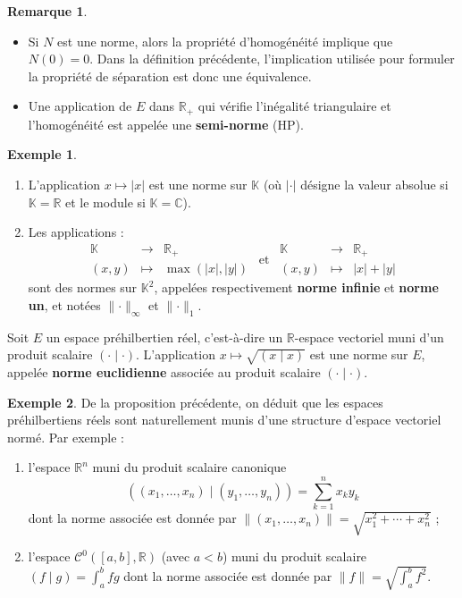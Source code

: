 \documentclass[french]{article}
\newcommand{\R}{\mathbb{R}}
\newcommand{\C}{\mathbb{C}}
\newcommand{\K}{\mathbb{K}}
\theoremstyle{plain}
\theoremstyle{definition}
\newtheorem*{ex}{Exemple}
\newtheorem*{rmq}{Remarque}
\theoremstyle{remark}
\begin{document}
\begin{rmq}
	\begin{itemize}
		\item Si $N$ est une norme, alors la propriété d'homogénéité implique que $N(0)=0$. Dans la définition précédente, l'implication utilisée pour formuler la propriété de séparation est donc une équivalence.
		\item Une application de $E$ dans $\R_+$ qui vérifie l'inégalité triangulaire et l'homogénéité est appelée une \textbf{semi-norme} (HP).
	\end{itemize}
\end{rmq}

\begin{ex}
	\begin{enumerate}
		\item L'application $x\mapsto\lvert x\rvert$ est une norme sur $\K$ (où $\lvert\cdot\rvert$ désigne la valeur absolue si $\K=\R$ et le module si $\K=\C$).
		\item Les applications : $$\begin{array}{rcl}
			\K&\longrightarrow&\R_+\\
			(x,y)&\longmapsto&\max(\lvert x\rvert,\lvert y\rvert)
		\end{array}\ \ \text{et}\ \ 
		\begin{array}{rcl}
			\K&\longrightarrow&\R_+\\
			(x,y)&\longmapsto&\lvert x\rvert+\lvert y\rvert
		\end{array}$$ sont des normes sur $\K^2$, appelées respectivement \textbf{norme infinie} et \textbf{norme un}, et notées $\lVert\cdot\rVert_\infty$ et $\lVert\cdot\rVert_1$.
	\end{enumerate}
\end{ex}

\begin{prop}
	Soit $E$ un espace préhilbertien réel, c'est-à-dire un $\R$-espace vectoriel muni d'un produit scalaire $(\cdot\mid\cdot)$. L'application $x\mapsto\sqrt{(x\mid x)}$ est une norme sur $E$, appelée \textbf{norme euclidienne} associée au produit scalaire $(\cdot\mid\cdot)$.
\end{prop}

\begin{ex}
	De la proposition précédente, on déduit que les espaces préhilbertiens réels sont naturellement munis d'une structure d'espace vectoriel normé. Par exemple :
	\begin{enumerate}
		\item l'espace $\R^n$ muni du produit scalaire canonique $$\left((x_1,\ldots,x_n)\mid(y_1,\ldots,y_n)\right)=\sum_{k=1}^{n}x_ky_k$$ dont la norme associée est donnée par $\lVert(x_1,\ldots,x_n)\rVert=\sqrt{x_1^2+\cdots+x_n^2}$ ;
		\item l'espace $\mathcal{C}^0([a,b],\R)$ (avec $a<b$) muni du produit scalaire $(f\mid g)=\displaystyle\int_{a}^{b}fg$ dont la norme associée est donnée par $\lVert f\rVert=\displaystyle\sqrt{\int_{a}^{b}f^2}$.
	\end{enumerate}
\end{ex}
\end{document}
